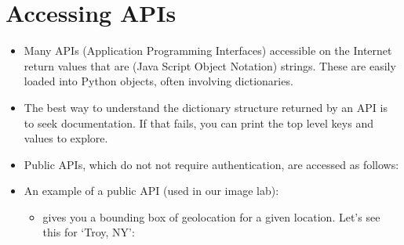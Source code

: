\documentclass[letterpaper,10pt,english]{sphinxmanual}
\begin{document}
\section{Accessing APIs}
\label{\detokenize{lecture_notes/lec17_dictionaries2:accessing-apis}}\begin{itemize}
\item {} 
Many APIs (Application Programming Interfaces) accessible on the
Internet return values that are  (Java Script Object
Notation) strings. These are easily loaded into Python objects,
often involving dictionaries.

\item {} 
The best way to understand the dictionary structure returned by an API
is to seek documentation. If that fails, you can print the top
level keys and values to explore.

\item {} 
Public APIs, which do not not require authentication, are accessed
as follows:

\begin{sphinxVerbatim}[commandchars=\\\{\}]
 
 

  
  
  
  
\end{sphinxVerbatim}

\item {} 
An example of a public API (used in our image lab):
\begin{itemize}
\item {} 
 gives you a bounding box of geolocation for a given
location. Let’s see this for ‘Troy, NY’:

\begin{sphinxVerbatim}[commandchars=\\\{\}]
  \PYGZbs{}
      \PYGZbs{}
\end{sphinxVerbatim}


\end{itemize}
\end{itemize}
\end{document}
